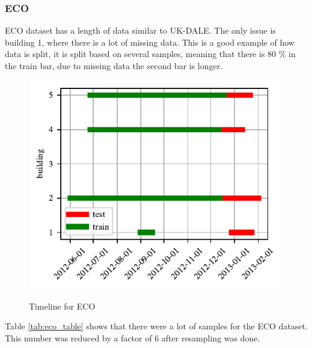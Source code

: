 \subsubsection{ECO}
ECO \cite{ECO} dataset has a length of data similar to UK-DALE. 
The only issue is building 1, where there is a lot of missing data.
This is a good example of how data is split, it is split based on several samples,
meaning that there is 80 \% in the train bar, due to missing data the second bar is longer. 

\begin{figure}[H]
	\centering
	\caption{Timeline for ECO}
	\includegraphics[]{Figures/EC/eco_timeline.pdf}
	\label{fig:eco_timeline}
\end{figure}

Table \ref{tab:eco_table} shows that there were a lot of samples for the ECO dataset.
This number was reduced by a factor of 6 after resampling was done.

